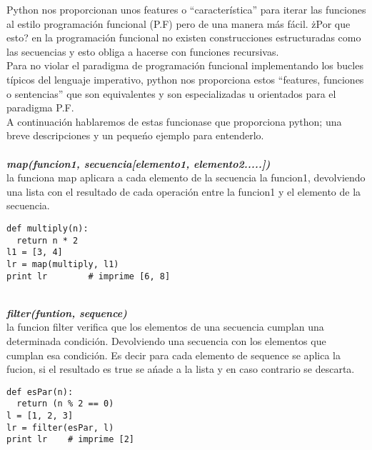 \begin{multicols}{2}
Python nos proporcionan unos features o ``característica'' para iterar las funciones al estilo programación funcional (P.F) pero de 
una manera más fácil. żPor que esto? en la programación funcional no existen construcciones estructuradas como las secuencias y esto 
obliga a  hacerse con funciones recursivas.\\
Para no violar el paradigma de programación funcional implementando los bucles típicos del lenguaje imperativo, python nos 
proporciona estos ``features, funciones o sentencias'' que son equivalentes y son especializadas u orientados para el paradigma P.F.\\
A continuación hablaremos de estas funcionase que proporciona python; una breve descripciones  y un pequeńo ejemplo para entenderlo.\\

\\ %
\textit{\textbf{map(funcion1, secuencia[elemento1, elemento2.....])}}\\
la funciona map aplicara a cada elemento de la secuencia la funcion1, devolviendo una lista con el resultado de cada operación entre la funcion1 
y el elemento de la secuencia.\\

\lstset{language=Python,frame=tb,framesep=5pt,basicstyle=\footnotesize}   
\begin{lstlisting}
def multiply(n):
  return n * 2
l1 = [3, 4]
lr = map(multiply, l1)
print lr		# imprime [6, 8]
\end{lstlisting}

\\ %
\textit{\textbf{filter(funtion, sequence)}}\\
la funcion filter verifica que los  elementos de una secuencia cumplan una determinada condición. Devolviendo una secuencia con los elementos que cumplan
esa condición. Es decir para cada elemento de sequence se aplica la fucion, si el resultado es true se ańade a la lista y en caso contrario se descarta. 


\lstset{language=Python,frame=tb,framesep=5pt,basicstyle=\footnotesize}   
\begin{lstlisting}
def esPar(n):
  return (n % 2 == 0)
l = [1, 2, 3]
lr = filter(esPar, l)
print lr	# imprime [2]
\end{lstlisting}


\end{multicols}
